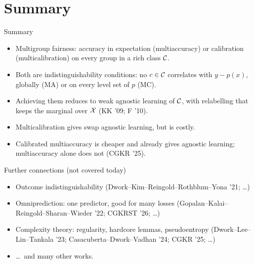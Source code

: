 
\AtBeginSection{}
\section{Summary}

\begin{frame}{Summary}
  \begin{itemize}
    \item \alert{Multigroup fairness}: accuracy in expectation
          (multiaccuracy) or calibration (multicalibration) on every group
          in a rich class $\mathcal{C}$.
    \item Both are \alert{indistinguishability} conditions: no $c \in \mathcal{C}$
          correlates with $y - p(x)$, globally (MA) or on every level set
          of $p$ (MC).
    \item Achieving them \alert{reduces to weak agnostic learning} of $\mathcal{C}$,
          with relabelling that keeps the marginal over $\mathcal{X}$
          \textcolor{muted}{(K\textcolor{ink}{K} '09; F '10)}.
    \item Multicalibration gives \alert{swap agnostic learning}, but is costly.
    \item \alert{Calibrated multiaccuracy} is cheaper and already gives
          agnostic learning; multiaccuracy alone does not
          \textcolor{muted}{(CG\textcolor{ink}{K}R '25)}.
  \end{itemize}
\end{frame}

\begin{frame}{Further connections
  {\normalsize\mdseries\textcolor{muted}{(not covered today)}}}
  \begin{itemize}
    \item \alert{Outcome indistinguishability}
          \textcolor{muted}{(Dwork--Kim--Reingold--Rothblum--Yona '21; \dots)}
    \item \alert{Omniprediction}: one predictor, good for many losses
          \textcolor{muted}{(Gopalan--Kalai--Reingold--Sharan--Wieder '22;
          CG\textcolor{ink}{K}RST '26; \dots)}
    \item \alert{Complexity theory}: regularity, hardcore lemmas, pseudoentropy
          \textcolor{muted}{(Dwork--Lee--Lin--Tankala '23; Casacuberta--Dwork--Vadhan '24;
          CG\textcolor{ink}{K}R '25; \dots)}
    \item[] \vspace{0.4em}\textcolor{muted}{\dots\ and many other works.}
  \end{itemize}
\end{frame}
